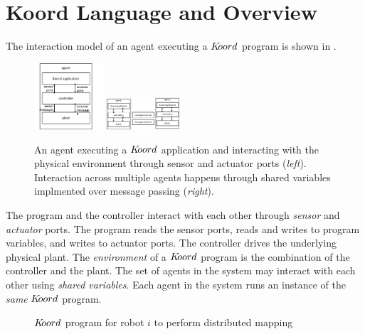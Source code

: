 \section{Koord Language and Overview}
\label{sec:semantics}
The interaction model of an agent executing a $K\kern-2pt oord$ program is shown in . 
\begin{figure}[h!]
\centering
\includegraphics[width=0.23\textwidth]{figs/arch.png}
\includegraphics[width=0.24\textwidth]{figs/agents2.png}
\caption{\small An agent executing a $K\kern-2pt oord$ application and interacting with the physical environment through sensor and actuator ports ({\em left}). Interaction across multiple agents happens through shared variables implmented over message passing ({\em right}).}
\label{fig:arch}
\end{figure}
The program and the controller interact with each other through {\em sensor} and {\em actuator} ports.  The program reads the sensor ports, reads and writes to program variables, and writes to actuator ports. The controller drives the underlying physical plant. The \emph{environment} of a  $K\kern-2pt oord$ program is the combination of the controller and the plant. The set of agents in the system may interact with each other using {\em shared variables\/}. Each agent in the system runs an instance of the \emph{same} $K\kern-2pt oord$ program. 
\begin{figure}[ht!]
    \noindent
    \begin{mdframed}

    \begin{center}
        \scriptsize
        {}
        {}
    \end{center}
    \end{mdframed}

    \caption{$K\kern-2pt oord$ program for robot $i$ to perform distributed mapping}
    \label{fig:mapapp}
\end{figure}
    
